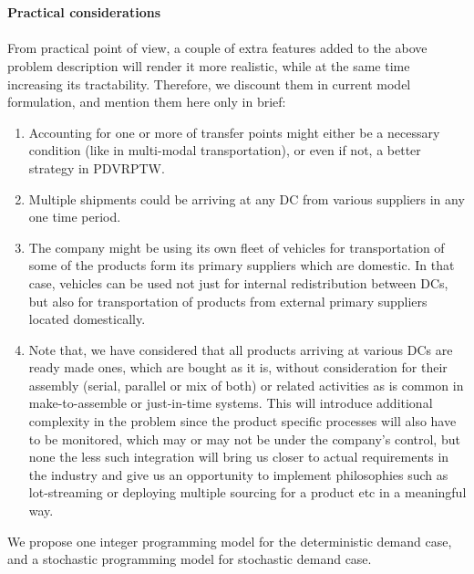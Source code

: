 \documentclass[11pt,letter]{article}
\begin{document}
\\
\\
\textbf{Practical considerations}
\\
\\
From practical point of view, a couple of extra features added to the above problem description will render it more realistic, while at the same time increasing its tractability. Therefore, we discount them in current model formulation, and mention them here only in brief:
\begin{enumerate}
\item Accounting for one or more of transfer points might either be a necessary condition (like in multi-modal transportation), or even if not, a better strategy in PDVRPTW. 
\item Multiple shipments could be arriving at any DC from various suppliers in any one time period.
\item The company might be using its own fleet of vehicles for transportation of some of the products form its primary suppliers which are domestic. In that case, vehicles can be used not just for internal redistribution between DCs, but also for transportation of products from external primary suppliers located domestically.
\item Note that, we have considered that all products arriving at various DCs are ready made ones, which are bought as it is, without consideration for their assembly (serial, parallel or mix of both) or related activities as is common in make-to-assemble or just-in-time systems. This will introduce additional complexity in the problem since the product specific processes will also have to be monitored, which may or may not be under the company's control, but none the less such integration will bring us closer to actual requirements in the industry and give us an opportunity to implement philosophies such as lot-streaming or deploying multiple sourcing for a product etc in a meaningful way.
\end{enumerate}

\noindent
We propose one integer programming model for the deterministic demand case, and a stochastic programming model for stochastic demand case.
\end{document}
